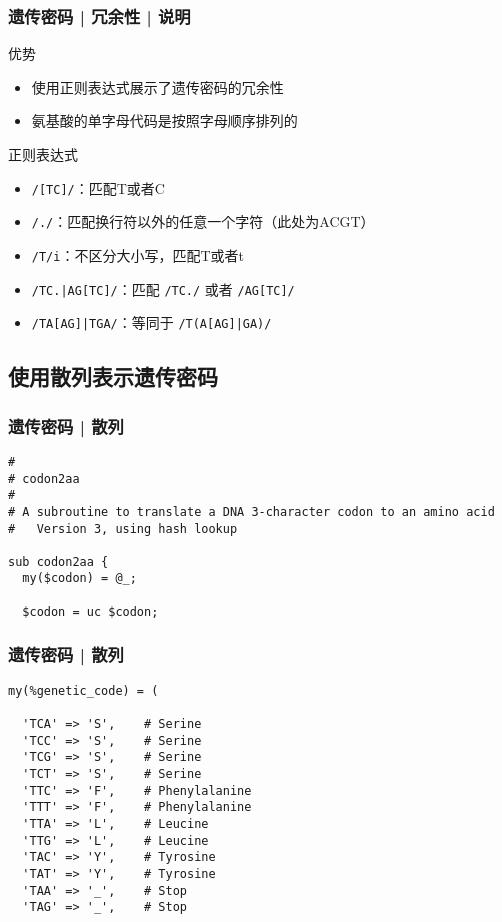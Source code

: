 \begin{frame}[fragile]
  \frametitle{遗传密码 | 冗余性 | 说明}
  \begin{block}{优势}
    \begin{itemize}
      \item 使用正则表达式展示了遗传密码的冗余性
      \item 氨基酸的单字母代码是按照字母顺序排列的
    \end{itemize}
  \end{block}
  \pause
  \begin{block}{\alert{正则表达式}}
    \begin{itemize}
      \item \verb|/[TC]/|：匹配T或者C
      \item \verb|/./|：匹配换行符以外的任意一个字符（此处为ACGT）
      \item \verb|/T/i|：不区分大小写，匹配T或者t
      \item \verb=/TC.|AG[TC]/=：匹配 \verb|/TC./| 或者 \verb|/AG[TC]/|
      \item \verb=/TA[AG]|TGA/=：等同于 \verb=/T(A[AG]|GA)/=
    \end{itemize}
  \end{block}
\end{frame}

\subsection{使用散列表示遗传密码}
\begin{frame}[fragile]
  \frametitle{遗传密码 | 散列}
\begin{lstlisting}[firstnumber=1]
#
# codon2aa
#
# A subroutine to translate a DNA 3-character codon to an amino acid
#   Version 3, using hash lookup

sub codon2aa {
  my($codon) = @_;

  $codon = uc $codon;
\end{lstlisting}
\end{frame}

\begin{frame}[fragile]
  \frametitle{遗传密码 | 散列}
\begin{lstlisting}[firstnumber=12]
  my(%genetic_code) = (

  'TCA' => 'S',    # Serine
  'TCC' => 'S',    # Serine
  'TCG' => 'S',    # Serine
  'TCT' => 'S',    # Serine
  'TTC' => 'F',    # Phenylalanine
  'TTT' => 'F',    # Phenylalanine
  'TTA' => 'L',    # Leucine
  'TTG' => 'L',    # Leucine
  'TAC' => 'Y',    # Tyrosine
  'TAT' => 'Y',    # Tyrosine
  'TAA' => '_',    # Stop
  'TAG' => '_',    # Stop
\end{lstlisting}
\end{frame}

